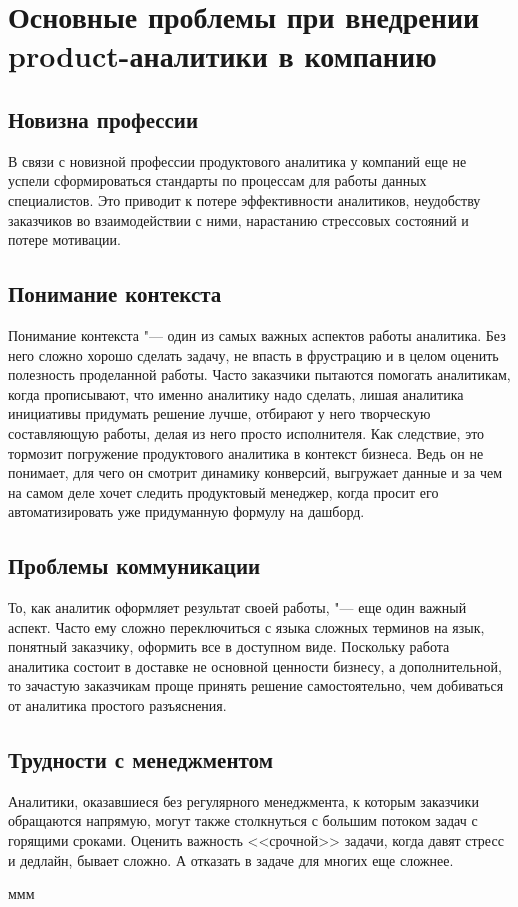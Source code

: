 \documentclass[referat, times]{SCWorks}
\begin{document}
\section{Основные проблемы при внедрении product-аналитики в компанию}
\subsection{Новизна профессии}
В связи с новизной профессии продуктового аналитика у компаний еще не успели сформироваться стандарты по процессам для работы данных специалистов. Это приводит к потере эффективности аналитиков, неудобству заказчиков во взаимодействии с ними, нарастанию стрессовых состояний и потере мотивации.

\subsection{Понимание контекста}
Понимание контекста "--- один из самых важных аспектов работы аналитика. Без него сложно хорошо сделать задачу, не впасть в фрустрацию и в целом оценить полезность проделанной работы. Часто заказчики пытаются помогать аналитикам, когда прописывают, что именно аналитику надо сделать, лишая аналитика инициативы придумать решение лучше, отбирают у него творческую составляющую работы, делая из него просто исполнителя. Как следствие, это тормозит погружение продуктового аналитика в контекст бизнеса. Ведь он не понимает, для чего он смотрит динамику конверсий, выгружает данные и за чем на самом деле хочет следить продуктовый менеджер, когда просит его автоматизировать уже придуманную формулу на дашборд.

\subsection{Проблемы коммуникации}
То, как аналитик оформляет результат своей работы, "--- еще один важный аспект. Часто ему сложно переключиться с языка сложных терминов на язык, понятный заказчику, оформить все в доступном виде. Поскольку работа аналитика состоит в доставке не основной ценности бизнесу, а дополнительной, то зачастую заказчикам проще принять решение самостоятельно, чем добиваться от аналитика простого разъяснения.

\subsection{Трудности с менеджментом}
Аналитики, оказавшиеся без регулярного менеджмента, к которым заказчики обращаются напрямую, могут также столкнуться с большим потоком задач с горящими сроками. Оценить важность <<срочной>> задачи, когда давят стресс и дедлайн, бывает сложно. А отказать в задаче для многих еще сложнее\cite{pilyavskaya}.



\conclusion
ммм
\nocite{*}




\appendix
\end{document}
